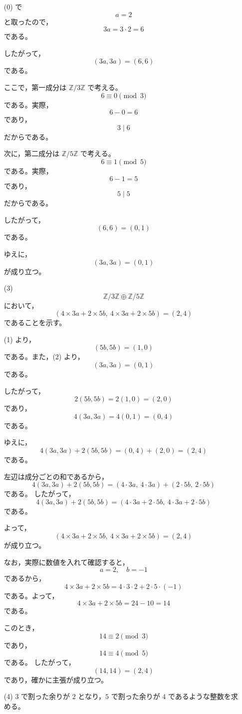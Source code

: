 \begin{solution}
\begin{enumerate}
		(0) で
		\[
		a=2
		\]
		と取ったので，
		\[
		3a=3\cdot 2=6
		\]
		である。
		
		したがって，
		\[
		(3a,3a)=(6,6)
		\]
		である。
		
		ここで，第一成分は \(\mathbb{Z}/3\mathbb{Z}\) で考える。
		\[
		6\equiv 0 \pmod{3}
		\]
		である。実際，
		\[
		6-0=6
		\]
		であり，
		\[
		3\mid 6
		\]
		だからである。
		
		次に，第二成分は \(\mathbb{Z}/5\mathbb{Z}\) で考える。
		\[
		6\equiv 1 \pmod{5}
		\]
		である。実際，
		\[
		6-1=5
		\]
		であり，
		\[
		5\mid 5
		\]
		だからである。
		
		したがって，
		\[
		(6,6)=(0,1)
		\]
		である。
		
		ゆえに，
		\[
		\boxed{
			(3a,3a)=(0,1)
		}
		\]
		が成り立つ。
		
		\item[(3)]
		\[
		\mathbb{Z}/3\mathbb{Z}
		\oplus
		\mathbb{Z}/5\mathbb{Z}
		\]
		において，
		\[
		(4\times 3a+2\times 5b,\ 4\times 3a+2\times 5b)
		=
		(2,4)
		\]
		であることを示す。
		
		(1) より，
		\[
		(5b,5b)=(1,0)
		\]
		である。また，(2) より，
		\[
		(3a,3a)=(0,1)
		\]
		である。
		
		したがって，
		\[
		2(5b,5b)=2(1,0)=(2,0)
		\]
		であり，
		\[
		4(3a,3a)=4(0,1)=(0,4)
		\]
		である。
		
		ゆえに，
		\[
		4(3a,3a)+2(5b,5b)
		=
		(0,4)+(2,0)
		=
		(2,4)
		\]
		である。
		
		左辺は成分ごとの和であるから，
		\[
		4(3a,3a)+2(5b,5b)
		=
		(4\cdot 3a,\ 4\cdot 3a)
		+
		(2\cdot 5b,\ 2\cdot 5b)
		\]
		である。
		したがって，
		\[
		4(3a,3a)+2(5b,5b)
		=
		(4\cdot 3a+2\cdot 5b,\ 4\cdot 3a+2\cdot 5b)
		\]
		である。
		
		よって，
		\[
		\boxed{
			(4\times 3a+2\times 5b,\ 4\times 3a+2\times 5b)
			=
			(2,4)
		}
		\]
		が成り立つ。
		
		なお，実際に数値を入れて確認すると，
		\[
		a=2,\quad b=-1
		\]
		であるから，
		\[
		4\times 3a+2\times 5b
		=
		4\cdot 3\cdot 2+2\cdot 5\cdot(-1)
		\]
		である。よって，
		\[
		4\times 3a+2\times 5b
		=
		24-10
		=
		14
		\]
		である。
		
		このとき，
		\[
		14\equiv 2\pmod{3}
		\]
		であり，
		\[
		14\equiv 4\pmod{5}
		\]
		である。
		したがって，
		\[
		(14,14)=(2,4)
		\]
		であり，確かに主張が成り立つ。
		
		\item[(4)]
		\(3\) で割った余りが \(2\) となり，\(5\) で割った余りが \(4\) であるような整数を求める。
		

\end{enumerate}
\end{solution}
